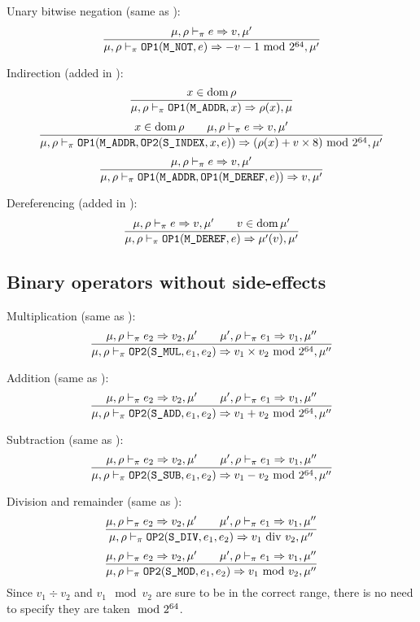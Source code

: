 Unary bitwise negation (same as \Cmm):
\[\dfrac{\mu,\rho\vdash_\pi e\Rightarrow v,\mu'}{\mu,\rho\vdash_\pi \texttt{OP1}(\texttt{M\_NOT}, e) \Rightarrow -v-1 \text{ mod } 2^{64},\mu'}\]

Indirection (added in \Cpm):
\[\dfrac{x\in\operatorname{dom}\rho}{\mu,\rho\vdash_\pi \texttt{OP1}(\texttt{M\_ADDR}, x)\Rightarrow \rho(x),\mu}\]
\[\dfrac{x\in\operatorname{dom}\rho \qquad \mu,\rho\vdash_\pi e\Rightarrow v,\mu'}{\mu,\rho\vdash_\pi \texttt{OP1}(\texttt{M\_ADDR}, \texttt{OP2}(\texttt{S\_INDEX}, x, e)) \Rightarrow (\rho(x)+v\times 8) \text{ mod } 2^{64}, \mu'}\]
\[\dfrac{\mu,\rho\vdash_\pi e\Rightarrow v,\mu'}{\mu,\rho\vdash_\pi \texttt{OP1}(\texttt{M\_ADDR}, \texttt{OP1}(\texttt{M\_DEREF}, e)) \Rightarrow v,\mu'}\]

Dereferencing (added in \Cpm):
\[\dfrac{\mu,\rho\vdash_\pi e\Rightarrow v,\mu' \qquad v\in\operatorname{dom}\mu'}{\mu,\rho\vdash_\pi \texttt{OP1}(\texttt{M\_DEREF}, e) \Rightarrow \mu'(v),\mu'}\]

\subsection{Binary operators without side-effects}
Multiplication (same as \Cmm):
\[\dfrac{\mu,\rho\vdash_\pi e_2\Rightarrow v_2,\mu' \qquad \mu',\rho\vdash_\pi e_1\Rightarrow v_1,\mu''}{\mu,\rho\vdash_\pi \texttt{OP2}(\texttt{S\_MUL}, e_1, e_2) \Rightarrow v_1\times v_2\text{ mod } 2^{64},\mu''}\]

Addition (same as \Cmm):
\[\dfrac{\mu,\rho\vdash_\pi e_2\Rightarrow v_2,\mu' \qquad \mu',\rho\vdash_\pi e_1\Rightarrow v_1,\mu''}{\mu,\rho\vdash_\pi \texttt{OP2}(\texttt{S\_ADD}, e_1, e_2) \Rightarrow v_1 + v_2\text{ mod } 2^{64},\mu''}\]

Subtraction (same as \Cmm):
\[\dfrac{\mu,\rho\vdash_\pi e_2\Rightarrow v_2,\mu' \qquad \mu',\rho\vdash_\pi e_1\Rightarrow v_1,\mu''}{\mu,\rho\vdash_\pi \texttt{OP2}(\texttt{S\_SUB}, e_1, e_2) \Rightarrow v_1 - v_2\text{ mod } 2^{64},\mu''}\]

Division and remainder (same as \Cmm):
\[\dfrac{\mu,\rho\vdash_\pi e_2\Rightarrow v_2,\mu' \qquad \mu',\rho\vdash_\pi e_1\Rightarrow v_1,\mu''}{\mu,\rho\vdash_\pi \texttt{OP2}(\texttt{S\_DIV}, e_1, e_2) \Rightarrow v_1 \text{ div } v_2,\mu''}\]
\[\dfrac{\mu,\rho\vdash_\pi e_2\Rightarrow v_2,\mu' \qquad \mu',\rho\vdash_\pi e_1\Rightarrow v_1,\mu''}{\mu,\rho\vdash_\pi \texttt{OP2}(\texttt{S\_MOD}, e_1, e_2) \Rightarrow v_1 \text{ mod } v_2,\mu''}\]
Since \(v_1 \div v_2\) and \(v_1 \mod v_2\) are sure to be in the correct range, there is no need to specify they are taken \(\text{ mod } 2^{64}\).

